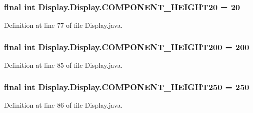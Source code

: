 \subsubsection[{C\+O\+M\+P\+O\+N\+E\+N\+T\+\_\+\+H\+E\+I\+G\+H\+T20}]{\setlength{\rightskip}{0pt plus 5cm}final int Display.\+Display.\+C\+O\+M\+P\+O\+N\+E\+N\+T\+\_\+\+H\+E\+I\+G\+H\+T20 = 20\hspace{0.3cm}{\ttfamily [static]}}\label{class_display_1_1_display_a205927f3e051ee88782c185b37c9e1d5}


Definition at line 77 of file Display.\+java.

\hypertarget{class_display_1_1_display_a880d1f86d07c77332fa8015e1b7a5145}{}
\subsubsection[{C\+O\+M\+P\+O\+N\+E\+N\+T\+\_\+\+H\+E\+I\+G\+H\+T200}]{\setlength{\rightskip}{0pt plus 5cm}final int Display.\+Display.\+C\+O\+M\+P\+O\+N\+E\+N\+T\+\_\+\+H\+E\+I\+G\+H\+T200 = 200\hspace{0.3cm}{\ttfamily [static]}}\label{class_display_1_1_display_a880d1f86d07c77332fa8015e1b7a5145}


Definition at line 85 of file Display.\+java.

\hypertarget{class_display_1_1_display_afbd2f610599f4393a4c30314c28ab73b}{}
\subsubsection[{C\+O\+M\+P\+O\+N\+E\+N\+T\+\_\+\+H\+E\+I\+G\+H\+T250}]{\setlength{\rightskip}{0pt plus 5cm}final int Display.\+Display.\+C\+O\+M\+P\+O\+N\+E\+N\+T\+\_\+\+H\+E\+I\+G\+H\+T250 = 250\hspace{0.3cm}{\ttfamily [static]}}\label{class_display_1_1_display_afbd2f610599f4393a4c30314c28ab73b}


Definition at line 86 of file Display.\+java.

